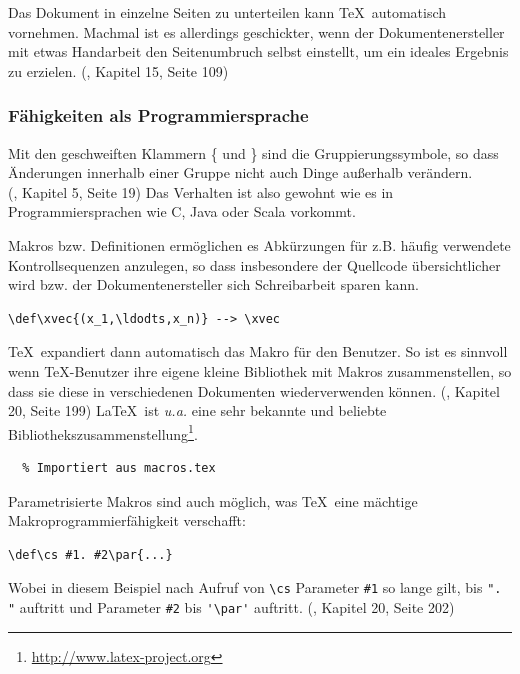 Das Dokument in einzelne Seiten zu unterteilen kann \TeX~automatisch
vornehmen. Machmal ist es allerdings geschickter, wenn der Dokumentenersteller
mit etwas Handarbeit den Seitenumbruch selbst einstellt, um ein ideales
Ergebnis zu erzielen. (\cite{tex-a}, Kapitel 15, Seite 109)

\subsubsection{Fähigkeiten als Programmiersprache}

Mit den geschweiften Klammern \{ und \} sind die Gruppierungssymbole, so
dass Änderungen innerhalb einer Gruppe nicht auch Dinge außerhalb
verändern.\\(\cite{tex-a}, Kapitel 5, Seite 19)
Das Verhalten ist also gewohnt wie es in Programmiersprachen wie C,
Java oder Scala vorkommt.

Makros bzw. Definitionen ermöglichen es Abkürzungen für z.B. häufig
verwendete Kontrollsequenzen anzulegen, so dass insbesondere
der Quellcode übersichtlicher wird bzw. der Dokumentenersteller sich
Schreibarbeit sparen kann.

\begin{verbatim}
\def\xvec{(x_1,\ldodts,x_n)} --> \xvec
\end{verbatim}

\TeX~expandiert dann automatisch das Makro für den Benutzer.
So ist es sinnvoll wenn \TeX-Benutzer ihre eigene kleine Bibliothek mit
Makros zusammenstellen, so dass sie diese in verschiedenen Dokumenten
wiederverwenden können. (\cite{tex-a}, Kapitel 20, Seite 199)
\LaTeX~ist \emph{u.a.} eine sehr bekannte und beliebte
Bibliothekszusammenstellung\footnote{\url{http://www.latex-project.org}}.

\begin{verbatim}
  % Importiert aus macros.tex
\end{verbatim}

Parametrisierte Makros sind auch möglich, was \TeX~eine mächtige
Makroprogrammierfähigkeit verschafft:

\begin{verbatim}
\def\cs #1. #2\par{...}
\end{verbatim}

Wobei in diesem Beispiel nach Aufruf von \lstinline|\cs| Parameter
\lstinline|#1| so lange gilt,
bis \lstinline|". "| auftritt und Parameter \lstinline|#2|
bis \lstinline|'\par'| auftritt. (\cite{tex-a}, Kapitel 20, Seite 202)

